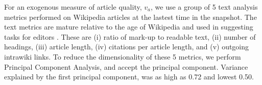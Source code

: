 For an exogenous measure of article quality, $ v_a$,  we use a group of 5 text analysis metrics performed on Wikipedia articles at the lastest time in the snapshot. The text metrics are mature relative to the age of Wikipedia \cite{stvilia} and used in suggesting tasks for editors \cite{wang}. These are (i) ratio of mark-up to readable text, (ii) number of headings, (iii) article length, (iv) citations per article length, and (v) outgoing intrawiki links. To reduce the dimensionality of these 5 metrics, we perform Principal Component Analysis, and accept the principal component. \cite{klein} Variance explained by the first principal component, was as high as 0.72 and lowest 0.50.
